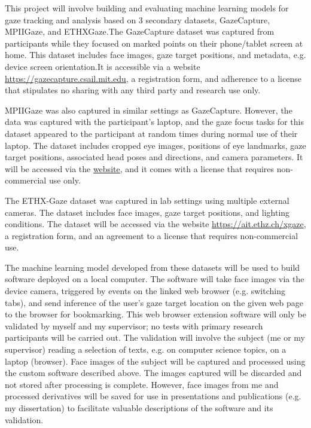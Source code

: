 \documentclass{report}
\begin{document}
This project will involve building and evaluating machine learning models for gaze tracking and analysis based on 3 secondary datasets, GazeCapture, MPIIGaze, and ETHXGaze.The GazeCapture \cite{krafka2016eye} dataset was captured from participants while they focused on marked points on their phone/tablet screen at home. This dataset includes face images, gaze target positions, and metadata, e.g. device screen orientation.It is accessible via a website \url{https://gazecapture.csail.mit.edu}, a registration form, and adherence to a license that stipulates no sharing with any third party and research use only.

MPIIGaze \cite{zhang15cvpr} was also captured in similar settings as GazeCapture. However, the data was captured with the participant's laptop, and the gaze focus tasks for this dataset appeared to the participant at random times during normal use of their laptop. The dataset includes cropped eye images, positions of eye landmarks, gaze target positions, associated head poses and directions, and camera parameters. It will be accessed via the \href{https://www.mpi-inf.mpg.de/departments/computer-vision-and-machine-learning/research/gaze-based-human-computer-interaction/appearance-based-gaze-estimation-in-the-wild/}{website}, and it comes with a license that requires non-commercial use only.

The ETHX-Gaze dataset \cite{zhang2020ethxgaze} was captured in lab settings using multiple external cameras. The dataset includes face images, gaze target positions, and lighting conditions. The dataset will be accessed via the website \url{https://ait.ethz.ch/xgaze}, a registration form, and an agreement to a license that requires non-commercial use.

The machine learning model developed from these datasets will be used to build software deployed on a local computer. The software will take face images via the device camera, triggered by events on the linked web browser (e.g. switching tabs), and send inference of the user's gaze target location on the given web page to the browser for bookmarking. This web browser extension software will only be validated by myself and my supervisor; no tests with primary research participants will be carried out. The validation will involve the subject (me or my supervisor) reading a selection of texts, e.g. on computer science topics, on a laptop (browser). Face images of the subject will be captured and processed using the custom software described above. The images captured will be discarded and not stored after processing is complete. However, face images from me and processed derivatives will be saved for use in presentations and publications (e.g. my dissertation) to facilitate valuable descriptions of the software and its validation.
\end{document}
